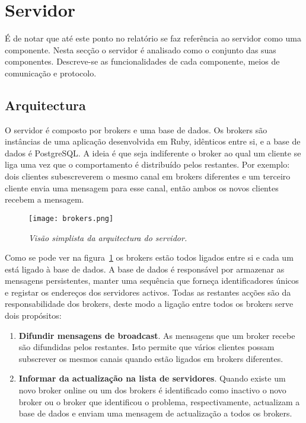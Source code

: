 \section{Servidor}

É de notar que até este ponto no relatório se faz referência ao servidor como uma componente.
Nesta secção o servidor é analisado como o conjunto das suas componentes.
Descreve-se as funcionalidades de cada componente, meios de comunicação e protocolo.

\subsection{Arquitectura}

O servidor é composto por brokers e uma base de dados. Os brokers são instâncias de uma aplicação desenvolvida em Ruby, idênticos entre si, e a base de dados é PostgreSQL. A ideia é que seja indiferente o broker ao qual um cliente se liga uma vez que o comportamento é distribuído pelos restantes.
Por exemplo: dois clientes subescreverem o mesmo canal em brokers diferentes e um terceiro cliente envia uma mensagem para esse canal, então ambos os novos clientes recebem a mensagem.

\begin{figure}[H]
\centering
\texttt{[image: brokers.png]}
\caption{\textit{Visão simplista da arquitectura do servidor.}}
\label{fig:brokers-arq}
\end{figure}

Como se pode ver na figura~\ref{fig:brokers-arq} os brokers estão todos ligados entre si e cada um está ligado à base de dados. A base de dados é responsável por armazenar as mensagens persistentes, manter uma sequência que forneça identificadores únicos e registar os endereços dos servidores activos. Todas as restantes acções são da responsabilidade dos brokers, deste modo a ligação entre todos os brokers serve dois propósitos:

\begin{enumerate}
\item \textbf{Difundir mensagens de broadcast}. As mensagens que um broker recebe são difundidas pelos restantes. Isto permite que vários clientes possam subscrever os mesmos canais quando estão ligados em brokers diferentes.
\item \textbf{Informar da actualização na lista de servidores}. Quando existe um novo broker online ou um dos brokers é identificado como inactivo o novo broker ou o broker que identificou o problema, respectivamente, actualizam a base de dados e enviam uma mensagem de actualização a todos os brokers.
\end{enumerate}

